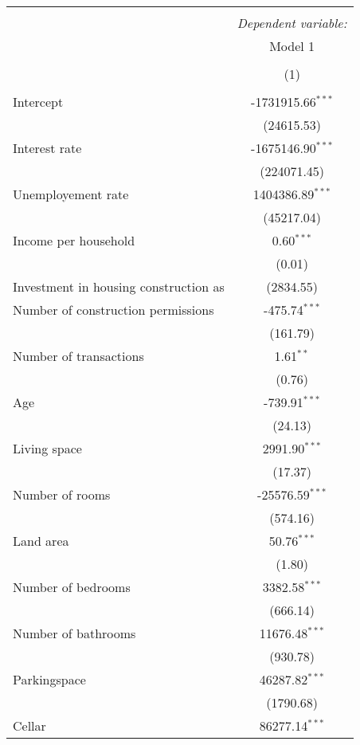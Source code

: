 \begin{table}[!htbp] \centering
\begin{tabular}{@{\extracolsep{5pt}}lc}
\\[-1.8ex]\hline
\hline \\[-1.8ex]
& \multicolumn{1}{c}{\textit{Dependent variable:}} \
\cr \cline{1-2}
\\[-1.8ex] & \multicolumn{1}{c}{Model 1} \\\\[-1.8ex] & (1) \\
\hline \\[-1.8ex]
 Intercept & -1731915.66$^{***}$ \\
  & (24615.53) \\
 Interest rate & -1675146.90$^{***}$ \\
  & (224071.45) \\
 Unemployement rate & 1404386.89$^{***}$ \\
  & (45217.04) \\
 Income per household & 0.60$^{***}$ \\
  & (0.01) \\
 Investment in housing construction as %
  & (2834.55) \\
 Number of construction permissions & -475.74$^{***}$ \\
  & (161.79) \\
 Number of transactions & 1.61$^{**}$ \\
  & (0.76) \\
 Age & -739.91$^{***}$ \\
  & (24.13) \\
 Living space & 2991.90$^{***}$ \\
  & (17.37) \\
 Number of rooms & -25576.59$^{***}$ \\
  & (574.16) \\
 Land area & 50.76$^{***}$ \\
  & (1.80) \\
 Number of bedrooms & 3382.58$^{***}$ \\
  & (666.14) \\
 Number of bathrooms & 11676.48$^{***}$ \\
  & (930.78) \\
 Parkingspace & 46287.82$^{***}$ \\
  & (1790.68) \\
 Cellar & 86277.14$^{***}$ \\

\end{tabular}
\end{table}
